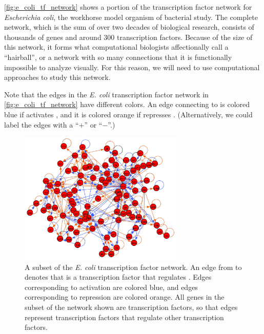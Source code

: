 \autoref{fig:e_coli_tf_network} shows a portion of the transcription factor network for \textit{Escherichia coli}, the workhorse model organism of bacterial study. The complete network, which is the sum of over two decades of biological research, consists of thousands of genes and around 300 transcription factors. Because of the size of this network, it forms what computational biologists affectionally call a ``hairball'', or a network with so many connections that it is functionally impossible to analyze visually. For this reason, we will need to use computational approaches to study this network.

Note that the edges in the \textit{E. coli} transcription factor network in \autoref{fig:e_coli_tf_network} have different colors. An edge connecting  to  is colored blue if  activates , and it is colored orange if  represses . (Alternatively, we could label the edges with a ``+'' or ``$-$''.)\\

\begin{qbox}\end{qbox}

\begin{figure}[h]
\centering
\mySfFamily
\includegraphics[width = 0.7\textwidth]{../images_CMYK/e_coli_tf_network_blue_orange}
\caption{A subset of the \textit{E. coli} transcription factor network. An edge from  to  denotes that  is a transcription factor that regulates . Edges corresponding to activation are colored blue, and edges corresponding to repression are colored orange. All genes in the subset of the network shown are transcription factors, so that edges represent transcription factors that regulate other transcription factors.}
\label{fig:e_coli_tf_network}
\end{figure}

